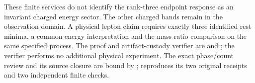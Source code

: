 These finite services do not identify the rank-three endpoint response as
an invariant charged energy sector. The other charged bands remain in the
observation domain. A physical lepton claim requires exactly three identified
rest minima, a common energy interpretation and the mass-ratio comparison
on the same specified process. The proof and artifact-custody verifier are
 and
; the verifier performs no
additional physical experiment. The exact phase/count review and its source
closure are bound by
;
 reproduces its
two original receipts and two independent finite checks.
